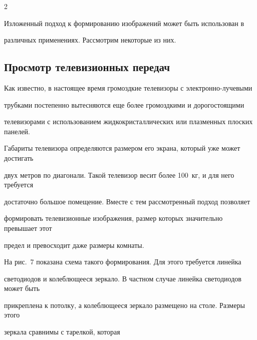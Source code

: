 \begin{multicols}{2}



  Изложенный подход к формированию изображений может быть использован в 

различных применениях. Рассмотрим некоторые из них. 






\subsection{Просмотр телевизионных передач}

  

  Как известно, в настоящее время громоздкие телевизоры с электронно-лучевыми 

трубками постепенно вытесняются еще более громоздкими и дорогостоящими 

телевизорами с использованием жидкокристаллических или плазменных плоских панелей. 

Габариты телевизора определяются размером его экрана, который уже может достигать 

двух метров по диагонали. Такой телевизор весит более 100~кг, и для него требуется 

достаточно большое помещение. Вместе с тем рассмотренный подход позволяет 

формировать телевизионные изображения, размер которых значительно превышает этот 

предел и превосходит даже размеры комнаты. 

  

  

  На рис.~7 показана схема такого формирования. Для этого требуется линейка 

светодиодов и колеблющееся зеркало. В частном случае линейка светодиодов может быть 

прикреплена к потолку, а колеблющееся зеркало размещено на столе. Размеры этого 

зеркала сравнимы с тарелкой, которая\linebreak\vspace*{-12pt}





\begin{center}


\end{center}
\end{multicols}
